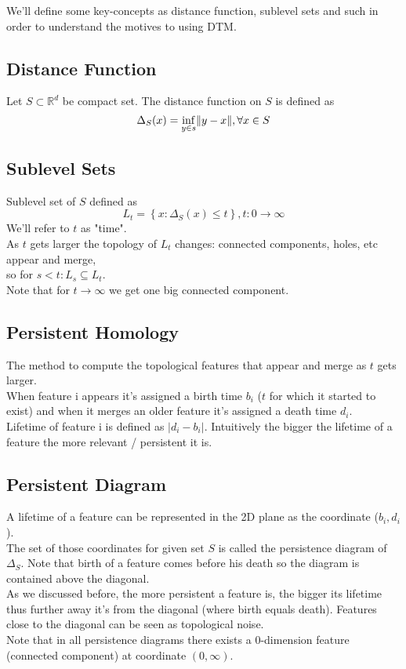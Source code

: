 \documentclass[11pt]{article}
\theoremstyle{definition}
\theoremstyle{definition}
\begin{document}
We'll define some key-concepts as distance function, sublevel sets and such in order to understand the motives to using DTM.

\subsection{Distance Function}
Let $S \subset \mathbb{R}^d$ be compact set. The distance function on $S$ is defined as
$$\Delta_S(x) = \inf_{y \in s} \mathopen\| y-x \mathclose\|, \forall x \in S$$

\subsection{Sublevel Sets}
Sublevel set of $S$ defined as
$$L_t = \left\{ x: \Delta_S(x) \leq t \right\}, t: 0 \rightarrow \infty$$
We'll refer to $t$ as "time".\\
As $t$ gets larger the topology of $L_t$ changes: connected components, holes, etc appear and merge,\\ so for $s < t: L_s \subseteq L_t$.\\
Note that for $t \rightarrow \infty$ we get one big connected component.


\subsection{Persistent Homology}
The method to compute the topological features that appear and merge as $t$ gets larger.\\
When feature i appears it's assigned a birth time $b_i$ ($t$ for which it started to exist) and when it merges an older feature it's assigned a death time $d_i$.\\
Lifetime of feature i is defined as $|d_i - b_i|$.
Intuitively the bigger the lifetime of a feature the more relevant / persistent it is.

\subsection{Persistent Diagram}
A lifetime of a feature can be represented in the 2D plane as the coordinate ($b_i,d_i$).\\
The set of those coordinates for given set $S$ is called the persistence diagram of $\Delta_S$. Note that birth of a feature comes before his death so the diagram is contained above the diagonal.\\
As we discussed before, the more persistent a feature is, the bigger its lifetime thus further away it's from the diagonal (where birth equals death). Features close to the diagonal can be seen as topological noise.\\
Note that in all persistence diagrams there exists a 0-dimension feature (connected component) at coordinate $(0,\infty)$.
\end{document}

